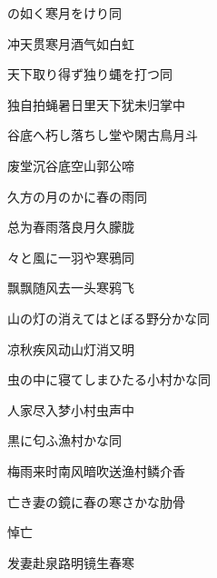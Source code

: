 \begin{haiku}
    {\FH {}の如く寒月をけり}\hfill{\FH 同}

    {\FK 冲天贯寒月酒气如白虹}
\end{haiku}

\begin{haiku}
    {\FH 天下取り得ず独り蝿を打つ}\hfill{\FH 同}

    {\FK 独自拍蝇暑日里天下犹未归掌中}
\end{haiku}

\begin{haiku}
    {\FH 谷底へ朽し落ちし堂や閑古鳥}\hfill{\FH 月斗}

    {\FK 废堂沉谷底空山郭公啼}
\end{haiku}

\begin{haiku}
    {\FH 久方の月のかに春の雨}\hfill{\FH 同}

    {\FK 总为春雨落良月久朦胧}
\end{haiku}

\begin{haiku}
    {\FH {}々と風に一羽や寒鴉}\hfill{\FH 同}

    {\FK 飘飘随风去一头寒鸦飞}
\end{haiku}

\begin{haiku}
    {\FH 山の灯の消えてはとぼる野分かな}\hfill{\FH 同}

    {\FK 凉秋疾风动山灯消又明}
\end{haiku}

\begin{haiku}
    {\FH 虫の中に寝てしまひたる小村かな}\hfill{\FH 同}

    {\FK 人家尽入梦小村虫声中}
\end{haiku}

\begin{haiku}
    {\FH 黒に匂ふ漁村かな}\hfill{\FH 同}

    {\FK 梅雨来时南风暗吹送渔村鳞介香}
\end{haiku}

\begin{haiku}
    {\FH 亡き妻の鏡に春の寒さかな}\hfill{\FH 肋骨}

    {\FK 悼亡}

    {\FK 发妻赴泉路明镜生春寒}
\end{haiku}


